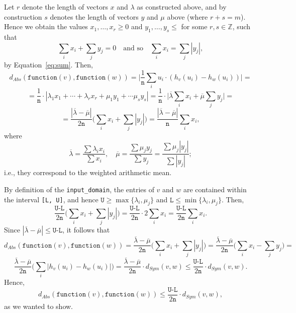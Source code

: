 \documentclass[11pt,a4paper]{article}
\theoremstyle{definition}
\newcommand{\MultiSet}{\mathrm{MultiSet}}
\newcommand{\function}{\texttt{function}}
\begin{document}
Let $r$ denote the length of vectors $x$ and $\lambda$ as constructed above, and by construction $s$ denotes the length of vectors $y$ and $\mu$ above (where $r+s = m$). Hence we obtain the values $x_1, \ldots, x_r \geq 0$ and $y_1, \ldots, y_s \leq$ for some $r, s \in \mathbb{Z}$, such that
\[
    \sum_i x_i + \sum_j y_j = 0 \quad \textrm{and so} \quad \sum_i x_i = \sum_j |y_j|,
\]
by Equation~\ref{eq:sum}. Then,
\[
    d_{Abs}(\function(v), \function(w)) = \Big|\dfrac{1}{\texttt{n}}\sum_i u_i \cdot (h_v(u_i) - h_w(u_i))\Big| =
\]
\[
    = \dfrac{1}{\texttt{n}} \cdot |\lambda_1 x_1 + \cdots + \lambda_r x_r + \mu_1 y_1 + \cdots \mu_s y_s| = \dfrac{1}{\texttt{n}} \cdot\Big|\overline{\lambda} \sum_i x_i + \overline{\mu} \sum_j y_j\Big| = 
\]
\[
    = \dfrac{|\overline{\lambda} - \overline{\mu}|}{2 \texttt{n}} \Big(\sum_i x_i + \sum_j |y_j|\Big) = \dfrac{|\overline{\lambda} - \overline{\mu}|}{\texttt{n}} \sum_i x_i,
\]  
where
\[
    \overline{\lambda} = \dfrac{\sum \lambda_i x_i}{\sum x_i}, \quad \overline{\mu} = \dfrac{\sum \mu_j y_j}{\sum y_j} = \dfrac{\sum \mu_j |y_j|}{\sum |y_j|};
\]
i.e., they correspond to the weighted arithmetic mean. 

By definition of the \texttt{input\_domain}, the entries of $v$ and $w$ are contained within the interval \texttt{[L, U]}, and hence $\texttt{U} \geq \max\{\lambda_i, \mu_j\}$ and $\texttt{L} \leq \min\{\lambda_i, \mu_j\}$. Then,
\[
    \dfrac{\texttt{U-L}}{2\texttt{n}} \Big(\sum_i x_i + \sum_j |y_j|\Big) = \dfrac{\texttt{U-L}}{2\texttt{n}} \cdot 2 \sum_i x_i = \dfrac{\texttt{U-L}}{2\texttt{n}} \sum_i x_i.
\]
Since $|\overline{\lambda} - \overline{\mu}| \leq \texttt{U-L}$, it follows that
\[
    d_{Abs}(\function(v), \function(w)) = \dfrac{\overline{\lambda}-\overline{\mu}}{2\texttt{n}}\Big(\sum_i x_i + \sum_j |y_j|\Big) = \dfrac{\overline{\lambda}-\overline{\mu}}{2\texttt{n}}\Big(\sum_i x_i - \sum_j y_j\Big) =
\]
\[
    \dfrac{\overline{\lambda}-\overline{\mu}}{2\texttt{n}} \Big(\sum_i |h_v(u_i) - h_w(u_i)| \Big) = \dfrac{\overline{\lambda}-\overline{\mu}}{2\texttt{n}} \cdot d_{Sym}(v, w) \leq \dfrac{\texttt{U-L}}{2\texttt{n}} \cdot d_{Sym}(v, w).
\]
Hence,
\[
    d_{Abs}(\function(v), \function(w)) \leq \dfrac{\texttt{U-L}}{2\texttt{n}} \cdot d_{Sym}(v, w),
\]
as we wanted to show.
\end{document}
